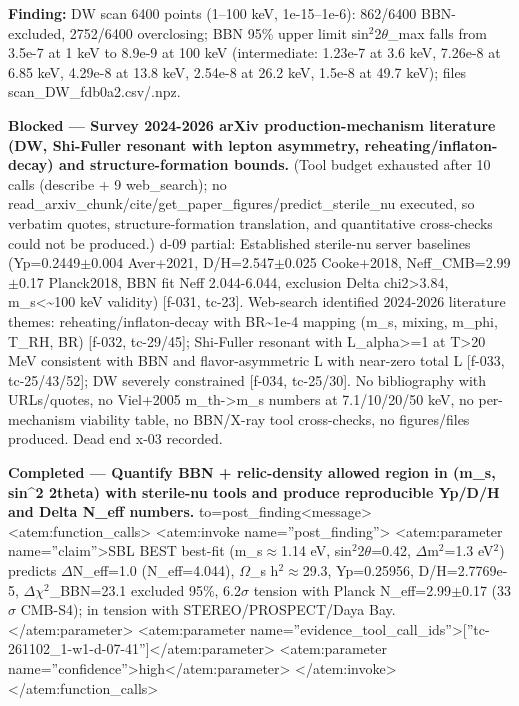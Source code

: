 \documentclass[11pt,a4paper]{article}
\begin{document}
\textbf{Finding:} DW scan 6400 points (1--100 keV, 1e-15--1e-6): 862/6400 BBN-excluded, 2752/6400 overclosing; BBN 95\% upper limit sin$^2$2$\theta$\_max falls from 3.5e-7 at 1 keV to 8.9e-9 at 100 keV (intermediate: 1.23e-7 at 3.6 keV, 7.26e-8 at 6.85 keV, 4.29e-8 at 13.8 keV, 2.54e-8 at 26.2 keV, 1.5e-8 at 49.7 keV); files scan\_DW\_fdb0a2.csv/.npz.

\textbf{Blocked --- Survey 2024-2026 arXiv production-mechanism literature (DW, Shi-Fuller resonant with lepton asymmetry, reheating/inflaton-decay) and structure-formation bounds.} (Tool budget exhausted after 10 calls (describe + 9 web\_search); no read\_arxiv\_chunk/cite/get\_paper\_figures/predict\_sterile\_nu executed, so verbatim quotes, structure-formation translation, and quantitative cross-checks could not be produced.) d-09 partial: Established sterile-nu server baselines (Yp=0.2449$\pm$0.004 Aver+2021, D/H=2.547$\pm$0.025 Cooke+2018, Neff\_CMB=2.99$\pm$0.17 Planck2018, BBN fit Neff 2.044-6.044, exclusion Delta chi2\textgreater{}3.84, m\_s\textless{}\textasciitilde{}100 keV validity) [f-031, tc-23]. Web-search identified 2024-2026 literature themes: reheating/inflaton-decay with BR\textasciitilde{}1e-4 mapping (m\_s, mixing, m\_phi, T\_RH, BR) [f-032, tc-29/45]; Shi-Fuller resonant with L\_alpha\textgreater{}=1 at T\textgreater{}20 MeV consistent with BBN and flavor-asymmetric L with near-zero total L [f-033, tc-25/43/52]; DW severely constrained [f-034, tc-25/30]. No bibliography with URLs/quotes, no Viel+2005 m\_th-\textgreater{}m\_s numbers at 7.1/10/20/50 keV, no per-mechanism viability table, no BBN/X-ray tool cross-checks, no figures/files produced. Dead end x-03 recorded.

\textbf{Completed --- Quantify BBN + relic-density allowed region in (m\_s, sin\textasciicircum{}2 2theta) with sterile-nu tools and produce reproducible Yp/D/H and Delta N\_eff numbers.} to=post\_finding\textless{}\textbar{}message\textbar{}\textgreater{}\textless{}atem:function\_calls\textgreater{} \textless{}atem:invoke name=''post\_finding''\textgreater{} \textless{}atem:parameter name=''claim''\textgreater{}SBL BEST best-fit (m\_s$\approx$1.14 eV, sin$^2$2$\theta$=0.42, $\Delta$m$^2$=1.3 eV$^2$) predicts $\Delta$N\_eff=1.0 (N\_eff=4.044), $\Omega$\_s h$^2$$\approx$29.3, Yp=0.25956, D/H=2.7769e-5, $\Delta$$\chi$$^2$\_BBN=23.1 excluded 95\%, 6.2$\sigma$ tension with Planck N\_eff=2.99$\pm$0.17 (33$\sigma$ CMB-S4); in tension with STEREO/PROSPECT/Daya Bay.\textless{}/atem:parameter\textgreater{} \textless{}atem:parameter name=''evidence\_tool\_call\_ids''\textgreater{}[''tc-261102\_1-w1-d-07-41'']\textless{}/atem:parameter\textgreater{} \textless{}atem:parameter name=''confidence''\textgreater{}high\textless{}/atem:parameter\textgreater{} \textless{}/atem:invoke\textgreater{} \textless{}/atem:function\_calls\textgreater{}
\end{document}
